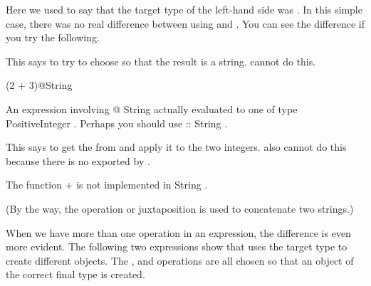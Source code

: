 Here we used  to say that the target type of the
left-hand side was .
In this simple case, there was no real difference
between using \spadSyntax{$} and .
You can see the difference if you try the following.
\begin{xtc}
\begin{xtccomment}
This says to try to choose \spadop{+} so that the result is
a string.
\Language{} cannot do this.
\end{xtccomment}
\begin{spadsrc}
(2 + 3)@String
\end{spadsrc}
\begin{MessageOutput}
   An expression involving @ String actually evaluated to one of type 
      PositiveInteger . Perhaps you should use :: String .
\end{MessageOutput}
\end{xtc}
\begin{xtc}
\begin{xtccomment}
This says to get the \spadop{+} from  and apply
it to the two integers.
\Language{} also cannot do this because there is no \spadop{+}
exported by .
\end{xtccomment}
\begin{MessageOutput}
   The function + is not implemented in String .
\end{MessageOutput}
\end{xtc}
(By the way, the operation  or juxtaposition
is used to concatenate two strings.)

When we have more than one operation in an expression, the
difference is even more evident.
The following two expressions show that \Language{} uses the
target type to create different objects.
The \spadop{+}, \spadop{*} and \spadop{^} operations are all
chosen so that an object of the correct final type is created.

